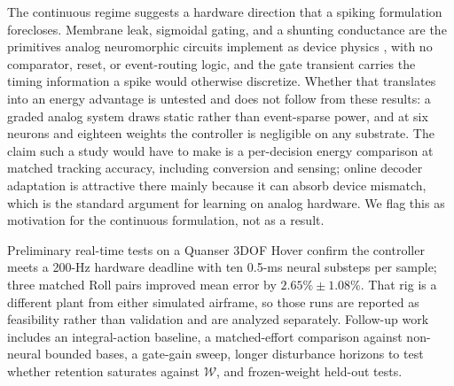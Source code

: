 \documentclass[letterpaper,10pt,conference]{IEEEtran}
\begin{document}
The continuous regime suggests a hardware direction that a spiking
formulation forecloses. Membrane leak, sigmoidal gating, and a shunting
conductance are the primitives analog neuromorphic circuits implement as
device physics \cite{mahowald1991vlsi}, with no comparator, reset, or
event-routing logic, and the gate transient carries the timing information a
spike would otherwise discretize. Whether that translates into an energy
advantage is untested and does not follow from these results: a graded
analog system draws static rather than event-sparse power, and at six
neurons and eighteen weights the controller is negligible on any substrate.
The claim such a study would have to make is a per-decision energy
comparison at matched tracking accuracy, including conversion and sensing;
online decoder adaptation is attractive there mainly because it can absorb
device mismatch, which is the standard argument for learning on analog
hardware. We flag this as motivation for the continuous formulation, not as
a result.

Preliminary real-time tests on a Quanser 3DOF Hover confirm the controller
meets a 200-Hz hardware deadline with ten 0.5-ms neural substeps per sample;
three matched Roll pairs improved mean error by $2.65\%\pm1.08\%$. That rig
is a different plant from either simulated airframe, so those runs are
reported as feasibility rather than validation and are analyzed separately.
Follow-up work includes an integral-action baseline, a matched-effort
comparison against non-neural bounded bases, a gate-gain sweep, longer
disturbance horizons to test whether retention saturates against
$\mathcal W$, and frozen-weight held-out tests.



\end{document}
